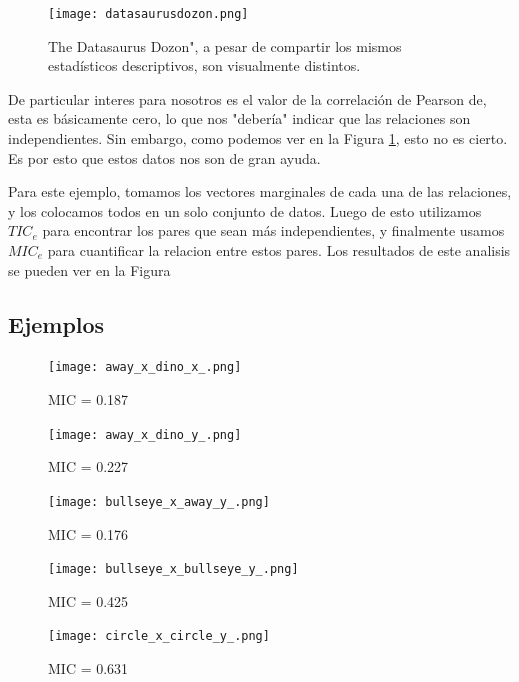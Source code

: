 	\begin{figure}[H] 
		\centering
		\texttt{[image: datasaurusdozon.png]}
		\caption{The Datasaurus Dozon", a pesar de compartir los mismos estad\'isticos descriptivos, son visualmente distintos.}
		\label{datasaurus_fig}
	\end{figure}

	De particular interes para nosotros es el valor de la correlaci\'on de Pearson de, esta es b\'asicamente cero, lo que nos "deber\'ia" indicar que las relaciones son independientes. Sin embargo, como podemos ver en la Figura \ref{datasaurus_fig}, esto no es cierto. Es por esto que estos datos nos son de gran ayuda. 

	Para este ejemplo, tomamos los vectores marginales de cada una de las relaciones, y los colocamos todos en un solo conjunto de datos. Luego de esto utilizamos $TIC_e$ para encontrar los pares que sean m\'as independientes, y finalmente usamos $MIC_e$ para cuantificar la relacion entre estos pares. Los resultados de este analisis se pueden ver en la Figura %


	\subsection[]{Ejemplos}
	\begin{figure}[H]
		\centering
		\texttt{[image: away\_x\_dino\_x\_.png]}
		\caption{ MIC = 0.187}
		\end{figure}
		
		\begin{figure}[H]
		\centering
		\texttt{[image: away\_x\_dino\_y\_.png]}
		\caption{ MIC = 0.227}
		\end{figure}
		
		\begin{figure}[H]
		\centering
		\texttt{[image: bullseye\_x\_away\_y\_.png]}
		\caption{ MIC = 0.176}
		\end{figure}
		
		\begin{figure}[H]
		\centering
		\texttt{[image: bullseye\_x\_bullseye\_y\_.png]}
		\caption{ MIC = 0.425}
		\end{figure}
		
		\begin{figure}[H]
		\centering
		\texttt{[image: circle\_x\_circle\_y\_.png]}
		\caption{ MIC = 0.631}
		\end{figure}
		
